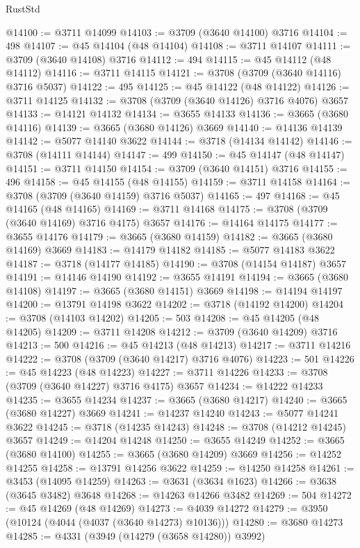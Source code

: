 \begin{lexlean}{RustStd}
\begin{coremodule}
@14100 := @3711 @14099
@14103 := @3709 (@3640 @14100) @3716
@14104 := 498
@14107 := @45 @14104 (@48 @14104)
@14108 := @3711 @14107
@14111 := @3709 (@3640 @14108) @3716
@14112 := 494
@14115 := @45 @14112 (@48 @14112)
@14116 := @3711 @14115
@14121 := @3708 (@3709 (@3640 @14116) @3716 @5037)
@14122 := 495
@14125 := @45 @14122 (@48 @14122)
@14126 := @3711 @14125
@14132 := @3708 (@3709 (@3640 @14126) @3716 @4076) @3657
@14133 := @14121 @14132
@14134 := @3655 @14133
@14136 := @3665 (@3680 @14116)
@14139 := @3665 (@3680 @14126) @3669
@14140 := @14136 @14139
@14142 := @5077 @14140 @3622
@14144 := @3718 (@14134 @14142)
@14146 := @3708 (@14111 @14144)
@14147 := 499
@14150 := @45 @14147 (@48 @14147)
@14151 := @3711 @14150
@14154 := @3709 (@3640 @14151) @3716
@14155 := 496
@14158 := @45 @14155 (@48 @14155)
@14159 := @3711 @14158
@14164 := @3708 (@3709 (@3640 @14159) @3716 @5037)
@14165 := 497
@14168 := @45 @14165 (@48 @14165)
@14169 := @3711 @14168
@14175 := @3708 (@3709 (@3640 @14169) @3716 @4175) @3657
@14176 := @14164 @14175
@14177 := @3655 @14176
@14179 := @3665 (@3680 @14159)
@14182 := @3665 (@3680 @14169) @3669
@14183 := @14179 @14182
@14185 := @5077 @14183 @3622
@14187 := @3718 (@14177 @14185)
@14190 := @3708 (@14154 @14187) @3657
@14191 := @14146 @14190
@14192 := @3655 @14191
@14194 := @3665 (@3680 @14108)
@14197 := @3665 (@3680 @14151) @3669
@14198 := @14194 @14197
@14200 := @13791 @14198 @3622
@14202 := @3718 (@14192 @14200)
@14204 := @3708 (@14103 @14202)
@14205 := 503
@14208 := @45 @14205 (@48 @14205)
@14209 := @3711 @14208
@14212 := @3709 (@3640 @14209) @3716
@14213 := 500
@14216 := @45 @14213 (@48 @14213)
@14217 := @3711 @14216
@14222 := @3708 (@3709 (@3640 @14217) @3716 @4076)
@14223 := 501
@14226 := @45 @14223 (@48 @14223)
@14227 := @3711 @14226
@14233 := @3708 (@3709 (@3640 @14227) @3716 @4175) @3657
@14234 := @14222 @14233
@14235 := @3655 @14234
@14237 := @3665 (@3680 @14217)
@14240 := @3665 (@3680 @14227) @3669
@14241 := @14237 @14240
@14243 := @5077 @14241 @3622
@14245 := @3718 (@14235 @14243)
@14248 := @3708 (@14212 @14245) @3657
@14249 := @14204 @14248
@14250 := @3655 @14249
@14252 := @3665 (@3680 @14100)
@14255 := @3665 (@3680 @14209) @3669
@14256 := @14252 @14255
@14258 := @13791 @14256 @3622
@14259 := @14250 @14258
@14261 := @3453 (@14095 @14259)
@14263 := @3631 (@3634 @1623)
@14266 := @3638 (@3645 @3482) @3648
@14268 := @14263 @14266 @3482
@14269 := 504
@14272 := @45 @14269 (@48 @14269)
@14273 := @4039 @14272
@14279 := @3950 (@10124 (@4044 (@4037 (@3640 @14273) @10136)))
@14280 := @3680 @14273
@14285 := @4331 (@3949 (@14279 (@3658 @14280)) @3992)

\end{coremodule}
\end{lexlean}

